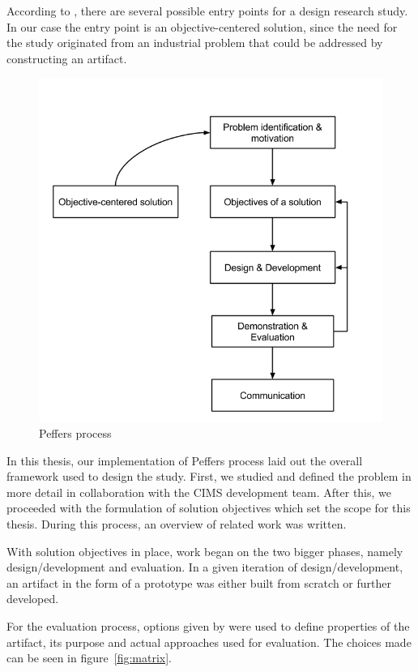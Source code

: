 According to \cite{Peffers}, there are several possible entry points for a design research study. In our case the entry point is an objective-centered solution, since the need for the study originated from an industrial problem that could be addressed by constructing an artifact.
\begin{figure}[h!]
\centering
\includegraphics[width=0.7\pdfpagewidth]{figure/Peffer.png}
\caption{Peffers process}
\label{fig:peffer}
\end{figure}

In this thesis, our implementation of Peffers process laid out the overall framework used to design the study. First, we studied and defined the problem in more detail in collaboration with the CIMS development team. After this, we proceeded with the formulation of solution objectives which set the scope for this thesis. During this process, an overview of related work was written.

With solution objectives in place, work began on the two bigger phases, namely design/development and evaluation. In a given iteration of design/development, an artifact in the form of a prototype was either built from scratch or further developed.

For the evaluation process, options given by \cite{DesignEval} were used to define properties of the artifact, its purpose and actual approaches used for evaluation. The choices made can be seen in figure~\ref{fig:matrix}.

